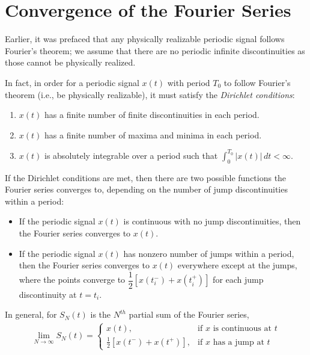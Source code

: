 \documentclass{report}
\begin{document}
\section{Convergence of the Fourier Series}
Earlier, it was prefaced that any physically realizable periodic signal follows Fourier's theorem; we assume that there are no periodic infinite discontinuities 
as those cannot be physically realized. 
\begin{tcolorbox}[width=\textwidth,colback={white}, sharp corners]
    In fact, in order for a periodic signal $x(t)$ with period $T_0$ to follow Fourier's theorem (i.e., be physically realizable), 
    it must satisfy the \emph{Dirichlet conditions}:
    \begin{enumerate}
        \item $x(t)$ has a finite number of finite discontinuities in each period.
        \item $x(t)$ has a finite number of maxima and minima in each period.
        \item $x(t)$ is absolutely integrable over a period such that $\displaystyle\int_{0}^{T_0}|x(t)| \,dt < \infty$.
    \end{enumerate}
\end{tcolorbox}
\begin{tcolorbox}[width=\textwidth,colback={white}, sharp corners]
    If the Dirichlet conditions are met, then there are two possible functions the Fourier series converges to, depending on the number of jump discontinuities within a period:
    \begin{itemize}
        \item If the periodic signal $x(t)$ is continuous with no jump discontinuities, then the Fourier series converges to $x(t)$.
        \item If the periodic signal $x(t)$ has nonzero number of jumps within a period, then the Fourier series converges to $x(t)$ everywhere except at the jumps, where 
        the points converge to $\dfrac{1}{2}[x(t_i^-)+x(t_i^+)]$ for each jump discontinuity at $t=t_i$.
    \end{itemize}
    In general, for $S_N(t)$ is the $N^{th}$ partial sum of the Fourier series, 
    \begin{align}
        \lim_{N\rightarrow\infty} S_N(t) = 
        \begin{cases}
            x(t), & \text{if $x$ is continuous at $t$} \\
            \frac{1}{2}[x(t^-)+x(t^+)], & \text{if $x$ has a jump at $t$}
        \end{cases}
    \end{align}
\end{tcolorbox}
\end{document}
